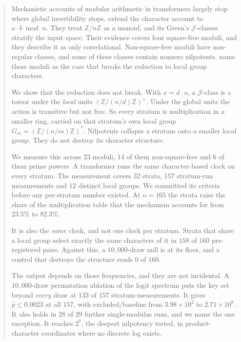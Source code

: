 \begin{abstract}
Mechanistic accounts of modular arithmetic in transformers largely stop where global
invertibility stops. \citet{chen2026multiplication} extend the character account to
$a \cdot b \bmod n$. They treat $\mathbb{Z}/n\mathbb{Z}$ as a monoid, and its Green's
$\mathcal{J}$-classes stratify the input space. Their evidence covers four square-free moduli,
and they describe it as only correlational. Non-square-free moduli have non-regular classes, and
some of these classes contain nonzero nilpotents. \citet{chen2026multiplication} name these moduli as the case
that breaks the reduction to local group characters.

We show that the reduction does not break. With $x = d \cdot u$, a $\mathcal{J}$-class is a
torsor under the \emph{local} units $(\mathbb{Z}/(n/d)\mathbb{Z})^{\times}$. Under the global
units the action is transitive but not free. So every stratum is multiplication in a smaller
ring, carried on that stratum's own local group $G_{m} = (\mathbb{Z}/(n/m)\mathbb{Z})^{*}$.
Nilpotents collapse a stratum onto a smaller local group. They do not destroy its character structure.

We measure this across $23$ moduli, $14$ of them non-square-free and $6$ of them prime powers.
A transformer runs the same character-based clock on every stratum. The measurement covers $32$
strata, $157$ stratum-run measurements and $12$ distinct local groups. We committed its
criteria before any per-stratum number existed. At $n = 165$ the strata raise the share of the
multiplication table that the mechanism accounts for from $23.5\%$ to $82.3\%$.

It is also the \emph{same} clock, and not one clock per stratum. Strata that share a local group
select exactly the same characters of it in $158$ of $160$ pre-registered pairs. Against this, a
$10{,}000$-draw null is at its floor, and a control that destroys the structure reads $0$ of
$160$.

The output depends on those frequencies, and they are not incidental. A $10{,}000$-draw
permutation ablation of the logit spectrum puts the key set beyond \emph{every} draw at $133$ of
$157$ stratum-measurements. It gives $\hat{p} \le 0.0023$ at all $157$, with excluded/baseline
from $3.98 \times 10^{2}$ to $2.71 \times 10^{8}$. It also holds in $28$ of $29$ further
single-modulus runs, and we name the one exception. It reaches $2^{7}$, the deepest nilpotency
tested, in product-character coordinates where no discrete log exists.


\end{abstract}
